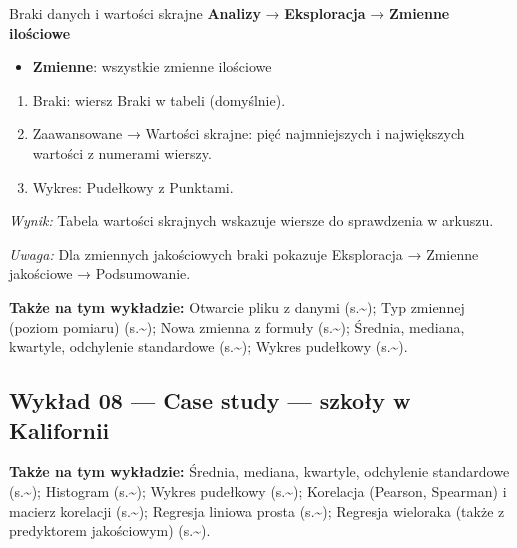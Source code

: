 \documentclass[
  polish,
  10pt,
  a4paper,
  DIV=11,
  numbers=noendperiod]{scrartcl}
\newcommand{\jmenu}[1]{{\color{upwraccent}\small #1}}
\begin{document}
\begin{jbox}{Braki danych i wartości skrajne}\label{w:braki-odstajace}
\jmenu{\textbf{Analizy} → \textbf{Eksploracja} → \textbf{Zmienne ilościowe}}

\begin{itemize}
\item[$\triangleright$] \textbf{Zmienne}: wszystkie zmienne ilościowe
\end{itemize}
\begin{enumerate}
\item Braki: wiersz Braki w tabeli (domyślnie).
\item Zaawansowane → Wartości skrajne: pięć najmniejszych i największych wartości z numerami wierszy.
\item Wykres: Pudełkowy z Punktami.
\end{enumerate}
\textit{Wynik:} Tabela wartości skrajnych wskazuje wiersze do sprawdzenia w arkuszu.

{\color{upwrsoft}\small\textit{Uwaga:} Dla zmiennych jakościowych braki pokazuje Eksploracja → Zmienne jakościowe → Podsumowanie.}
\end{jbox}

\textbf{Także na tym wykładzie:} Otwarcie pliku z danymi
(s.\textasciitilde{}\pageref{w:otworz-plik}); Typ zmiennej (poziom
pomiaru) (s.\textasciitilde{}\pageref{w:poziom-pomiaru}); Nowa zmienna z
formuły (s.\textasciitilde{}\pageref{w:oblicz-zmienna}); Średnia,
mediana, kwartyle, odchylenie standardowe
(s.\textasciitilde{}\pageref{w:statystyki-opisowe}); Wykres pudełkowy
(s.\textasciitilde{}\pageref{w:pudelkowy}).


\subsection{Wykład 08 --- Case study --- szkoły w
Kalifornii}\label{wykux142ad-08-case-study-szkoux142y-w-kalifornii}

\textbf{Także na tym wykładzie:} Średnia, mediana, kwartyle, odchylenie
standardowe (s.\textasciitilde{}\pageref{w:statystyki-opisowe});
Histogram (s.\textasciitilde{}\pageref{w:histogram}); Wykres pudełkowy
(s.\textasciitilde{}\pageref{w:pudelkowy}); Korelacja (Pearson,
Spearman) i macierz korelacji
(s.\textasciitilde{}\pageref{w:korelacja}); Regresja liniowa prosta
(s.\textasciitilde{}\pageref{w:regresja-prosta}); Regresja wieloraka
(także z predyktorem jakościowym)
(s.\textasciitilde{}\pageref{w:regresja-wieloraka}).
\end{document}
